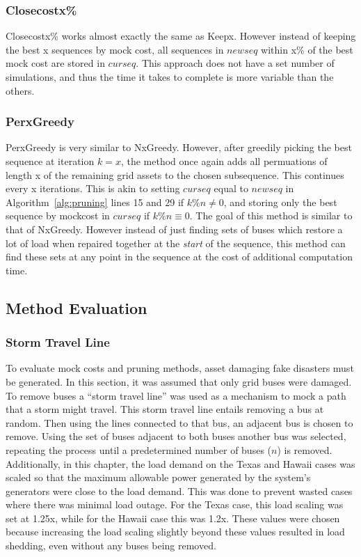 \documentclass[12pt]{article}
\begin{document}
\subsubsection{Closecostx\%}
Closecostx\% works almost exactly the same as Keepx. However instead of keeping the best x sequences by mock cost, all sequences in $newseq$ within x\% of the best mock cost are stored in $curseq$. This approach does not have a set number of simulations, and thus the time it takes to complete is more variable than the others.

\subsubsection{PerxGreedy}
PerxGreedy is very similar to NxGreedy. However, after greedily picking the best sequence at iteration $k=x$, the method once again adds all permuations of length x of the remaining grid assets to the chosen subsequence. This continues every x iterations. This is akin to setting $curseq$ equal to $newseq$ in Algorithm~\ref{alg:pruning} lines 15 and 29 if $k\%n \neq 0$, and storing only the best sequence by mockcost in $curseq$ if $k\%n \equiv 0$. The goal of this method is similar to that of NxGreedy. However instead of just finding sets of buses which restore a lot of load when repaired together at the \textit{start} of the sequence, this method can find these sets at any point in the sequence at the cost of additional computation time.

\subsection{Method Evaluation}
\subsubsection{Storm Travel Line}
To evaluate mock costs and pruning methods, asset damaging fake disasters must be generated. In this section, it was assumed that only grid buses were damaged. To remove buses a “storm travel line” was used as a mechanism to mock a path that a storm might travel. This storm travel line entails removing a bus at random. Then using the lines connected to that bus, an adjacent bus is chosen to remove. Using the set of buses adjacent to both buses another bus was selected, repeating the process until a predetermined number of buses ($n$) is removed. Additionally, in this chapter, the load demand on the Texas and Hawaii cases was scaled so that the maximum allowable power generated by the system's generators were close to the load demand. This was done to prevent wasted cases where there was minimal load outage. For the Texas case, this load scaling was set at 1.25x, while for the Hawaii case this was 1.2x. These values were chosen because increasing the load scaling slightly beyond these values resulted in load shedding, even without any buses being removed.
\end{document}
